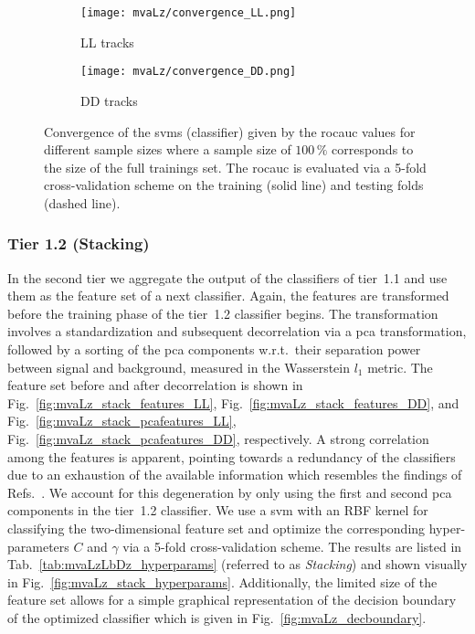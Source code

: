 \begin{figure}[htbp]
    \centering
    \begin{subfigure}[b]{.49\textwidth}
        \centering
        \texttt{[image: mvaLz/convergence\_LL.png]}
        \caption{\gls{LL} tracks}
    \end{subfigure}
    \begin{subfigure}[b]{.49\textwidth}
        \centering
        \texttt{[image: mvaLz/convergence\_DD.png]}
        \caption{\gls{DD} tracks}
    \end{subfigure}
    \caption{Convergence of the \glspl{svm} (\Lz classifier) given by the \gls{rocauc} values for different sample sizes where a sample size of $100\,\%$ corresponds to the size of the full trainings set. The \gls{rocauc} is evaluated via a 5-fold cross-validation scheme on the training (solid line) and testing folds (dashed line).}
    \label{fig:mvaLz_convergence}
\end{figure}

\subsubsection{Tier 1.2 (Stacking)}
In the second tier we aggregate the output of the classifiers of tier~1.1 and use them as the feature set of a next classifier.
Again, the features are transformed before the training phase of the tier~1.2 classifier begins.
The transformation involves a standardization and subsequent decorrelation via a \gls{pca} transformation, followed by a sorting of the \gls{pca} components w.r.t.\ their separation power between signal and background, measured in the Wasserstein $l_1$ metric.
The feature set before and after decorrelation is shown in Fig.~\ref{fig:mvaLz_stack_features_LL}, Fig.~\ref{fig:mvaLz_stack_features_DD}, and Fig.~\ref{fig:mvaLz_stack_pcafeatures_LL}, Fig.~\ref{fig:mvaLz_stack_pcafeatures_DD}, respectively.
A strong correlation among the features is apparent, pointing towards a redundancy of the classifiers due to an exhaustion of the available information which resembles the findings of Refs.~\cite{unreasonableeffdata1,unreasonableeffdata2}.
We account for this degeneration by only using the first and second \gls{pca} components in the tier~1.2 classifier.
We use a \gls{svm} with an RBF kernel for classifying the two-dimensional feature set and optimize the corresponding hyper-parameters $C$ and $\gamma$ via a 5-fold cross-validation scheme.
The results are listed in Tab.~\ref{tab:mvaLzLbDz_hyperparams} (referred to as \textit{Stacking}) and shown visually in Fig.~\ref{fig:mvaLz_stack_hyperparams}.
Additionally, the limited size of the feature set allows for a simple graphical representation of the decision boundary of the optimized classifier which is given in Fig.~\ref{fig:mvaLz_decboundary}.

